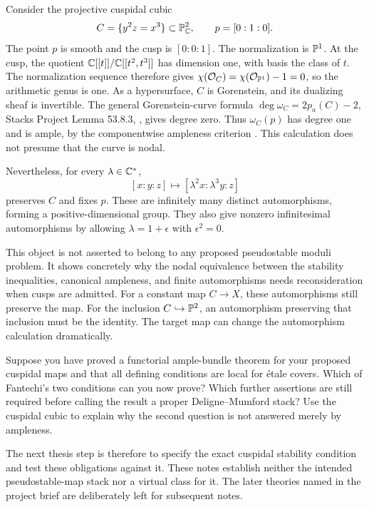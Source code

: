 \begin{Ex}
Consider the projective cuspidal cubic
\[
                  C=\{y^2z=x^3\}\subset\mathbb P^2_{\mathbb C},
                  \qquad p=[0:1:0].
\]
The point $p$ is smooth and the cusp is $[0:0:1]$.
The normalization is $\mathbb P^1$. At the cusp, the quotient
$\mathbb C[[t]]/\mathbb C[[t^2,t^3]]$ has dimension one, with basis
the class of $t$. The normalization sequence therefore gives
$\chi(\mathcal O_C)=\chi(\mathcal O_{\mathbb P^1})-1=0$, so
the arithmetic genus is one. As a hypersurface, $C$ is
Gorenstein, and its dualizing sheaf is invertible. The general
Gorenstein-curve formula
$\deg\omega_C=2p_a(C)-2$, Stacks Project Lemma 53.8.3,
, gives degree zero. Thus $\omega_C(p)$ has
degree one and is ample, by the componentwise ampleness
criterion . This calculation does not presume
that the curve is nodal.

Nevertheless, for every $\lambda\in\mathbb C^*$,
\[
       [x:y:z]\longmapsto[\lambda^2x:\lambda^3y:z]
\]
preserves $C$ and fixes $p$. These are infinitely many distinct
automorphisms, forming a positive-dimensional group. They also
give nonzero infinitesimal automorphisms by allowing
$\lambda=1+\epsilon$ with $\epsilon^2=0$.

This object is not asserted to belong to any proposed
pseudostable moduli problem. It shows concretely why the nodal
equivalence between the stability inequalities, canonical
ampleness, and finite automorphisms needs reconsideration when
cusps are admitted. For a constant map $C\to X$, these
automorphisms still preserve the map. For the inclusion
$C\hookrightarrow\mathbb P^2$, an automorphism preserving that
inclusion must be the identity. The target map can change the
automorphism calculation dramatically.
\end{Ex}

\begin{Ej}\label{ex:cusp-roadmap}
Suppose you have proved a functorial ample-bundle theorem for
your proposed cuspidal maps and that all defining conditions
are local for \'etale covers. Which of Fantechi's two conditions
can you now prove? Which further assertions are still required
before calling the result a proper Deligne--Mumford stack?
Use the cuspidal cubic to explain why the second question is
not answered merely by ampleness.
\end{Ej}

The next thesis step is therefore to specify the exact cuspidal
stability condition and test these obligations against it. These
notes establish neither the intended pseudostable-map stack nor
a virtual class for it. The later theories named in the project
brief are deliberately left for subsequent notes.
